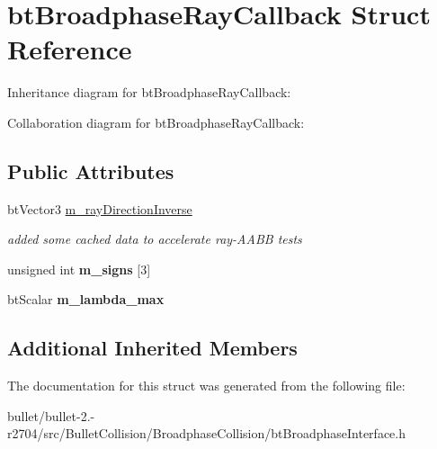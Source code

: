 \hypertarget{structbt_broadphase_ray_callback}{\section{bt\+Broadphase\+Ray\+Callback Struct Reference}
\label{structbt_broadphase_ray_callback}
}


Inheritance diagram for bt\+Broadphase\+Ray\+Callback\+:


Collaboration diagram for bt\+Broadphase\+Ray\+Callback\+:
\subsection*{Public Attributes}
\begin{DoxyCompactItemize}
\item 
\hypertarget{structbt_broadphase_ray_callback_a03043069b99348e18f6c386469450145}{bt\+Vector3 \hyperlink{structbt_broadphase_ray_callback_a03043069b99348e18f6c386469450145}{m\+\_\+ray\+Direction\+Inverse}}\label{structbt_broadphase_ray_callback_a03043069b99348e18f6c386469450145}

\begin{DoxyCompactList}\small\item\em added some cached data to accelerate ray-\/\+A\+A\+B\+B tests \end{DoxyCompactList}\item 
\hypertarget{structbt_broadphase_ray_callback_a9b7d417a0247ee3d2b557c0903ab1e7f}{unsigned int {\bfseries m\+\_\+signs} \mbox{[}3\mbox{]}}\label{structbt_broadphase_ray_callback_a9b7d417a0247ee3d2b557c0903ab1e7f}

\item 
\hypertarget{structbt_broadphase_ray_callback_aae217adc2c86b77abb636f2ebaa1f548}{bt\+Scalar {\bfseries m\+\_\+lambda\+\_\+max}}\label{structbt_broadphase_ray_callback_aae217adc2c86b77abb636f2ebaa1f548}

\end{DoxyCompactItemize}
\subsection*{Additional Inherited Members}


The documentation for this struct was generated from the following file\+:\begin{DoxyCompactItemize}
\item 
bullet/bullet-\/2.-\/r2704/src/\+Bullet\+Collision/\+Broadphase\+Collision/bt\+Broadphase\+Interface.\+h\end{DoxyCompactItemize}
